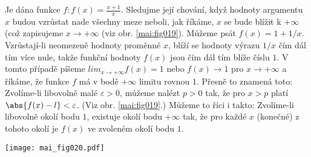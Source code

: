 \begin{mdframed}[style=mdexam]
  \begin{example}\label{MAI:exam031}
    Je dána funkce \(f: f(x) = \frac{x + 1}{x}\). Sledujme její chování, když hodnoty argumentu
    \(x\) budou vzrůstat nade všechny meze neboli, jak říkáme, \(x\) se bude blížit k \(+\infty\)
    (což zapisujeme \(x \to + \infty\) (viz obr. \ref{mai:fig019}). Můžeme psát \(f(x) = 1 + 1/x\).
    Vzrůstají-li neomezeně hodnoty proměnné \(x\), blíží se hodnoty výrazu \(1/x\) čím dál tím více
    nule, takže funkční hodnoty \(f(x)\) jsou čím dál tím blíže číslu \(1\). V tomto případě píšeme
    \(lim_{x\to+\infty}f(x) = 1\) nebo \(f(x) \to 1\) pro \(x\to +\infty\) a říkáme, že funkce \(f\)
    má v bodě \(+\infty\) limitu rovnou \(1\). Přesně to znamená toto: Zvolíme-li libovolně malé
    \(\varepsilon > 0\), můžeme nalézt \(p > 0\) tak, že pro \(x > p\) platí \(\abs{f(x) - l} <
    \varepsilon\). (Viz obr. \ref{mai:fig019}.) Můžeme to říci i takto: Zvolíme-li libovolně okolí
    bodu \(1\), existuje okolí bodu \(+\infty\) tak, že pro každé \(x\) (konečné) z tohoto okolí je
    \(f(x)\) ve zvoleném okolí bodu \(1\).
    
    {\centering
    \captionsetup{type=figure}
    \texttt{[image: mai\_fig020.pdf]}
    \par}
  \end{example}
\end{mdframed}
